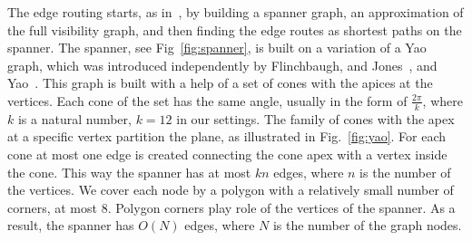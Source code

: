 \documentclass{llncs}
\begin{document}
The edge routing starts, as in~\cite{dwyer2010fast}, by building a spanner graph, an approximation of the full visibility graph,
and then finding the edge routes as shortest paths on the spanner. The spanner, see Fig~\ref{fig:spanner}, is built on a variation of a Yao graph, which was introduced independently by Flinchbaugh, and Jones~\cite{flinchbaugh1981strong}, and Yao~\cite{yao1982constructing}. This graph is built with a help of a set of cones with the apices at the vertices. Each cone of the set has the same angle,
usually in the form of $\frac{2\pi} {k}$, where $k$ is a natural number, $k = 12$ in our settings.
The family of cones with the apex at a specific vertex partition the plane, as illustrated in Fig.~\ref{fig:yao}. For each cone at most one edge is created connecting the cone apex with a vertex inside the cone. This way the spanner has at most $kn$ edges, where $n$ is the number of the vertices. We cover each node by a polygon with a relatively small number of corners, at most $8$. Polygon corners play role of the vertices of the spanner. As a result, the spanner has $O(N)$ edges, where $N$ is the number of the graph nodes.\\
\end{document}
